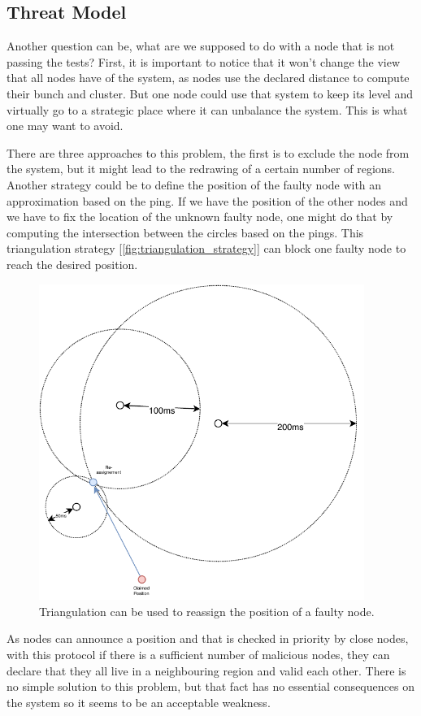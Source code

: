 \documentclass[a4paper,11pt,oneside]{report}
\begin{document}
\subsection{Threat Model}
Another question can be, what are we supposed to do with a node that is not
passing the tests? First, it is important to notice that it won't change the
view that all nodes have of the system, as nodes use the declared distance
to compute their bunch and cluster. But one node could use that system to keep
its level and virtually go to a strategic place where it can unbalance the
system. This is what one may want to avoid. 

There are three approaches to this problem, the first is to exclude the node
from the system, but it might lead to the redrawing of a certain number of
regions. Another strategy could be to define the position of the faulty node
with an approximation based on the ping. If we have the position of the other
nodes and we have to fix the location of the unknown faulty node, one might do
that by computing the intersection between the circles based on the pings. This
triangulation strategy [\autoref{fig:triangulation_strategy}] can block one
faulty node to reach the desired position. 

\begin{figure}[!h] \centering
  \includegraphics[width=300pt]{figures/triangulation_strategy}
  \caption{Triangulation can be used to reassign the position of a faulty
  node. }
\label{fig:triangulation_strategy}
\end{figure}

As nodes can announce a position and that is checked in priority by close
nodes, with this protocol if there is a sufficient number of malicious nodes,
they can declare that they all live in a neighbouring region and valid each other.
There is no simple solution to this problem, but that fact has no essential consequences
on the system so it seems to be an acceptable weakness.
\end{document}
